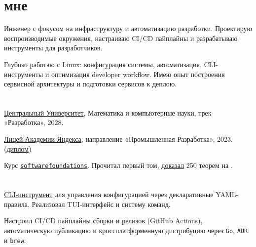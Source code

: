 \documentclass[margin,line]{resume}
\begin{document}
\begin{resume}

  \section{ мне}
  Инженер с фокусом на инфраструктуру и автоматизацию разработки.
  Проектирую воспроизводимые окружения, настраиваю CI/CD пайплайны
  и разрабатываю инструменты для разработчиков.

  Глубоко работаю с Linux: конфигурация системы, автоматизация,
  CLI-инструменты и оптимизация developer workflow.
  Имею опыт построения сервисной архитектуры и подготовки сервисов к деплою.

  \vspace{-1mm}

  \section{}
  \href{https://cu.ru/}{Центральный Университет},
  Математика и компьютерные науки, трек «Разработка», 2028.

  \href{https://lyceum.yandex.ru/}{Лицей
  Академии Яндекса}, направление «Промышленная Разработка», 2023.
  (\href{https://alchemmist.github.io/CV/attachments/yandex-lyceum.pdf}{диплом})

  Курс
  \texttt{\href{https://softwarefoundations.cis.upenn.edu}{softwarefoundations}}.
  Прочитал первый том,
  \href{https://github.com/alchemmist/coq-learning}{доказал} 250
  теорем на .

  \vspace{-1mm}

  \section{}\vspace{0mm}
  \begin{description}[leftmargin=0pt, itemindent=*, itemsep=8pt]

    \item[Devsyringe:]
      \href{https://devsyringe.alchemmist.xyz/}{CLI-инструмент}
      для управления конфигурацией через декларативные YAML-правила.
      Реализовал TUI-интерфейс и систему команд.

      Настроил CI/CD пайплайны сборки и релизов (GitHub Actions),
      автоматическую публикацию и кроссплатформенную дистрибуцию
      через \texttt{Go}, \texttt{AUR} и \texttt{brew}.


\end{description}
\end{resume}
\end{document}
